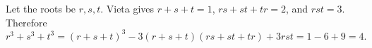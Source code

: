 Let the roots be $r,s,t$. Vieta gives $r+s+t=1$, $rs+st+tr=2$, and $rst=3$. Therefore
\[
r^3+s^3+t^3=(r+s+t)^3-3(r+s+t)(rs+st+tr)+3rst
=1-6+9=\boxed4.
\]
